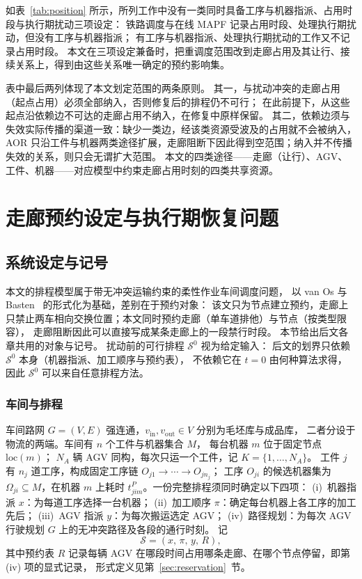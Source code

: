 \documentclass[manuscript,screen,review]{acmart}
\begin{document}
如表~\ref{tab:position} 所示，所列工作中没有一类同时具备工序与机器指派、占用时段与执行期扰动三项设定：
铁路调度与在线 MAPF 记录占用时段、处理执行期扰动，但没有工序与机器指派；
有工序与机器指派、处理执行期扰动的工作又不记录占用时段。
本文在三项设定兼备时，把重调度范围改到走廊占用及其让行、接续关系上，得到由这些关系唯一确定的预约影响集。

表中最后两列体现了本文划定范围的两条原则。
其一，与扰动冲突的走廊占用（起点占用）必须全部纳入，否则修复后的排程仍不可行；
在此前提下，从这些起点沿依赖边不可达的走廊占用不纳入，在修复中原样保留。
其二，依赖边须与失效实际传播的渠道一致：缺少一类边，经该类资源受波及的占用就不会被纳入，
AOR 只沿工件与机器两类途径扩展，走廊阻断下因此得到空范围；纳入并不传播失效的关系，则只会无谓扩大范围。
本文的四类途径——走廊（让行）、AGV、工件、机器——对应模型中约束走廊占用时刻的四类共享资源。

\section{走廊预约设定与执行期恢复问题}
\label{sec:problem}

\subsection{系统设定与记号}
\label{sec:system_brief}

本文的排程模型属于带无冲突运输约束的柔性作业车间调度问题，
以 van Os 与 Basten~\cite{vanos2026exact} 的形式化为基础，差别在于预约对象：
该文只为节点建立预约，走廊上只禁止两车相向交换位置；本文同时预约走廊（单车道排他）与节点（按类型限容），
走廊阻断因此可以直接写成某条走廊上的一段禁行时段。
本节给出后文各章共用的对象与记号。
扰动前的可行排程 \(\mathcal{S}^0\) 视为给定输入：
后文的划界只依赖 \(\mathcal{S}^0\) 本身（机器指派、加工顺序与预约表），
不依赖它在 \(t=0\) 由何种算法求得，因此 \(\mathcal{S}^0\) 可以来自任意排程方法。

\subsubsection{车间与排程}
\label{sec:shop}

车间路网 \(G=(V,E)\) 强连通，\(v_{\mathrm{in}},v_{\mathrm{out}}\in V\) 分别为毛坯库与成品库，
二者分设于物流的两端。车间有 \(n\) 个工件与机器集合 \(M\)，
每台机器 \(m\) 位于固定节点 \(\mathrm{loc}(m)\)；
\(N_A\) 辆 AGV 同构，每次只运一个工件，记 \(K=\{1,\ldots,N_A\}\)。
工件 \(j\) 有 \(n_j\) 道工序，构成固定工序链 \(O_{j1}\to\cdots\to O_{jn_j}\)；
工序 \(O_{ji}\) 的候选机器集为 \(\Omega_{ji}\subseteq M\)，在机器 \(m\) 上耗时
\(t^P_{jim}\)。一份完整排程须同时确定以下四项：
(i)~机器指派 \(x\)：为每道工序选择一台机器；
(ii)~加工顺序 \(\pi\)：确定每台机器上各工序的加工先后；
(iii)~AGV 指派 \(y\)：为每次搬运选定 AGV；
(iv)~路径规划：为每次 AGV 行驶规划 \(G\) 上的无冲突路径及各段的通行时刻。
记
\[
\mathcal{S}=(x,\,\pi,\,y,\,R),
\]
其中预约表 \(R\) 记录每辆 AGV 在哪段时间占用哪条走廊、在哪个节点停留，即第 (iv) 项的显式记录，
形式定义见第~\ref{sec:reservation}~节。
\end{document}
